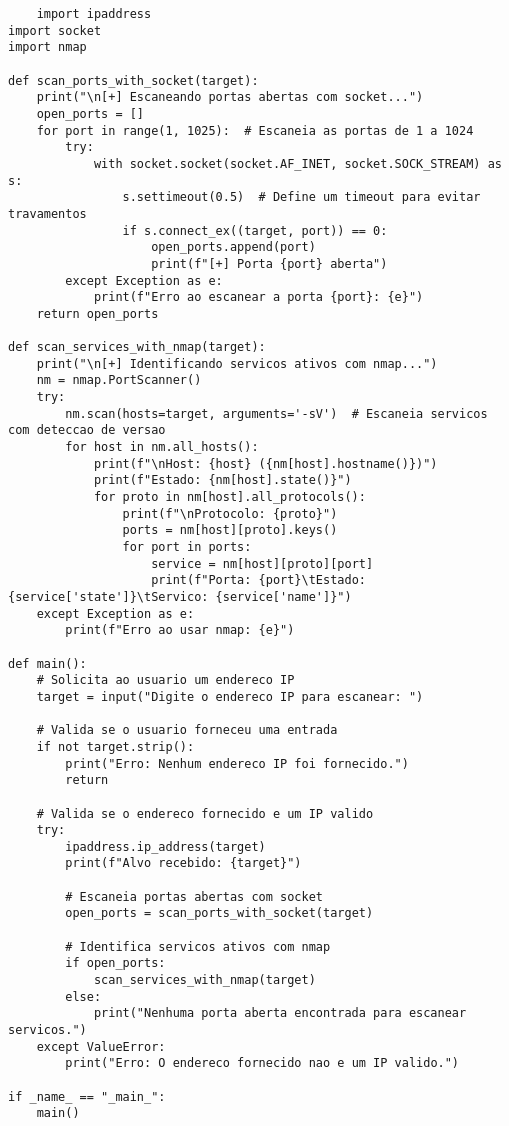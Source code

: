 \documentclass[12pt]{article}
\begin{document}
    \begin{lstlisting}
    import ipaddress
import socket
import nmap

def scan_ports_with_socket(target):
    print("\n[+] Escaneando portas abertas com socket...")
    open_ports = []
    for port in range(1, 1025):  # Escaneia as portas de 1 a 1024
        try:
            with socket.socket(socket.AF_INET, socket.SOCK_STREAM) as s:
                s.settimeout(0.5)  # Define um timeout para evitar travamentos
                if s.connect_ex((target, port)) == 0:
                    open_ports.append(port)
                    print(f"[+] Porta {port} aberta")
        except Exception as e:
            print(f"Erro ao escanear a porta {port}: {e}")
    return open_ports

def scan_services_with_nmap(target):
    print("\n[+] Identificando servicos ativos com nmap...")
    nm = nmap.PortScanner()
    try:
        nm.scan(hosts=target, arguments='-sV')  # Escaneia servicos com deteccao de versao
        for host in nm.all_hosts():
            print(f"\nHost: {host} ({nm[host].hostname()})")
            print(f"Estado: {nm[host].state()}")
            for proto in nm[host].all_protocols():
                print(f"\nProtocolo: {proto}")
                ports = nm[host][proto].keys()
                for port in ports:
                    service = nm[host][proto][port]
                    print(f"Porta: {port}\tEstado: {service['state']}\tServico: {service['name']}")
    except Exception as e:
        print(f"Erro ao usar nmap: {e}")

def main():
    # Solicita ao usuario um endereco IP
    target = input("Digite o endereco IP para escanear: ")

    # Valida se o usuario forneceu uma entrada
    if not target.strip():
        print("Erro: Nenhum endereco IP foi fornecido.")
        return

    # Valida se o endereco fornecido e um IP valido
    try:
        ipaddress.ip_address(target)
        print(f"Alvo recebido: {target}")

        # Escaneia portas abertas com socket
        open_ports = scan_ports_with_socket(target)

        # Identifica servicos ativos com nmap
        if open_ports:
            scan_services_with_nmap(target)
        else:
            print("Nenhuma porta aberta encontrada para escanear servicos.")
    except ValueError:
        print("Erro: O endereco fornecido nao e um IP valido.")

if _name_ == "_main_":
    main()
    \end{lstlisting}
\end{document}
